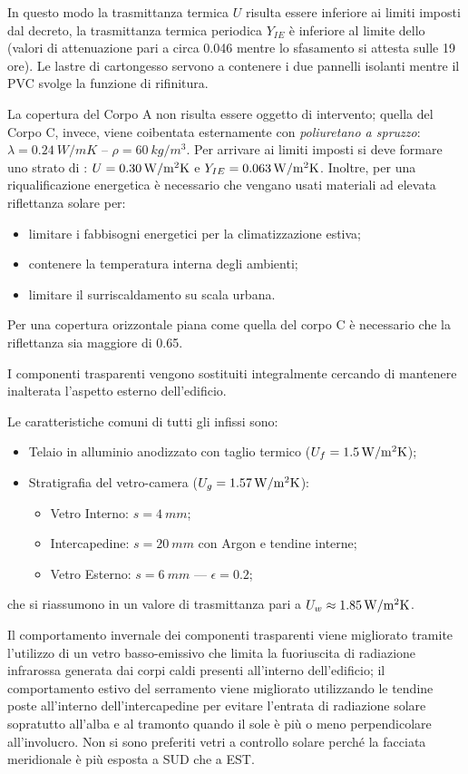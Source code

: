 In questo modo la trasmittanza termica $U$ risulta essere inferiore ai limiti imposti dal decreto, la trasmittanza termica periodica $Y_{IE}$ è inferiore al limite dello  (valori di attenuazione pari a circa \num{0.046} mentre lo sfasamento si attesta sulle \num{19} ore). Le lastre di cartongesso servono a contenere i due pannelli isolanti mentre il PVC svolge la funzione di rifinitura.

La copertura del Corpo A non risulta essere oggetto di intervento; quella del Corpo C, invece, viene coibentata esternamente con \emph{poliuretano a spruzzo}: $\lambda=\SI{0.24}{W/mK}$ -- $\rho=\SI{60}{kg/m^3}$. Per arrivare ai limiti imposti si deve formare uno strato di : $U=\SI{0.30}{\trasm}$ e $Y_{IE}=\SI{0.063}{\trasm}$. Inoltre, per una riqualificazione energetica è necessario che vengano usati materiali ad elevata riflettanza solare per:
\begin{itemize}
	\item limitare i fabbisogni energetici per la climatizzazione estiva;
	\item contenere la temperatura interna degli ambienti;
	\item limitare il surriscaldamento su scala urbana.
\end{itemize}
Per una copertura orizzontale piana come quella del corpo C è necessario che la riflettanza sia maggiore di \num{0.65}.


I componenti trasparenti vengono sostituiti integralmente cercando di mantenere inalterata l'aspetto esterno dell'edificio. 

Le caratteristiche comuni di tutti gli infissi sono:
\begin{itemize}
	\item Telaio in alluminio anodizzato con taglio termico ($U_f=\SI{1.5}{\trasm}$);
	\item Stratigrafia del vetro-camera ($U_g=\SI{1.57}{\trasm}$):
		\begin{itemize}
			\item Vetro Interno: $s=\SI{4}{mm}$;
			\item Intercapedine: $s=\SI{20}{mm}$ con Argon e tendine interne;
			\item Vetro Esterno: $s=\SI{6}{mm}$ --- $\epsilon=0.2$;
		\end{itemize}
\end{itemize}
che si riassumono in un valore di trasmittanza pari a $U_w \approx \SI{1.85}{\trasm}$.

Il comportamento invernale dei componenti trasparenti viene migliorato tramite l'utilizzo di un vetro basso-emissivo che limita la fuoriuscita di radiazione infrarossa generata dai corpi caldi presenti all'interno dell'edificio; il comportamento estivo del serramento viene migliorato utilizzando le tendine poste all'interno dell'intercapedine per evitare l'entrata di radiazione solare sopratutto all'alba e al tramonto quando il sole è più o meno perpendicolare all'involucro. Non si sono preferiti vetri a controllo solare perché la facciata meridionale è più esposta a SUD che a EST.

